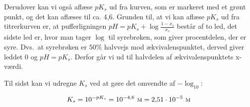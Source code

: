 Derudover kan vi også aflæse $pK_s$ ud fra kurven, som er markeret med et grønt punkt, og det kan aflæses til ca. 4,6.
Grunden til, at vi kan aflæse $pK_s$ ud fra titrerkurven er,
at pufferligningen $pH=pK_s+\log\frac{1-x_s}{x_s}$ består af to led, det sidste led er,
hvor man tager $\log$ til syrebrøken, som giver procentdelen, der er syre.
Dvs.~at syrebrøken er $50\%$ halvvejs mod ækvivalenspunktet, derved giver leddet 0 og $pH=pK_s$.
Derfor går vi ud til halvdelen af ækvivalenspunktets x-værdi.

Til sidst kan vi udregne $K_s$ ved at gøre det omvendte af $-\log_{10}$:

\[
K_s=10^{-pK_s}=10^{-4{,}6}\ \textsc{m}=2{,}51 \cdot 10^{-5}\ \textsc{m}    
\]
